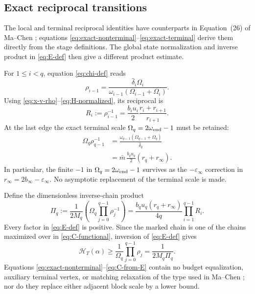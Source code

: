 \documentclass[11pt]{article}
\theoremstyle{definition}
\theoremstyle{remark}
\newcommand{\cert}{\mathcal{H}}
\newcommand{\invprod}{\Pi}
\newcommand{\rankmass}{M}
\begin{document}
\subsection{Exact reciprocal transitions}

The local and terminal reciprocal identities have counterparts in
Equation~(26) of Ma--Chen \cite{machen2026}; equations
\eqref{eq:exact-nonterminal}--\eqref{eq:exact-terminal} derive them directly
from the stage definitions.  The global state normalization and inverse
product in \eqref{eq:E-def} then give a different product estimate.

For \(1\le i<q\), equation \eqref{eq:chi-def} reads
\[
 \rho_{i-1}
 =\frac{\widehat\delta_i\Omega_i}
        {\omega_{i-1}(\Omega_{i-1}+\Omega_i)}.
\]
Using \eqref{eq:x-v-rho}--\eqref{eq:H-normalized}, its reciprocal is
\begin{equation}
 R_i:=\rho_{i-1}^{-1}
 =\frac{b_i u_i}{2}
  \frac{r_i+r_{i+1}}{r_{i+1}}.
 \label{eq:exact-nonterminal}
\end{equation}
At the last edge the exact terminal scale
\(\Omega_q=2\omega_{\rm end}-1\) must be retained:
\begin{equation}
\begin{aligned}
 \Omega_q\rho_{q-1}^{-1}
 &=\frac{\omega_{q-1}(\Omega_{q-1}+\Omega_q)}
         {\widehat\delta_q}\\
 &=\bar m\,\frac{b_qu_q}{2}(r_q+r_\infty).
\end{aligned}
\label{eq:exact-terminal}
\end{equation}
In particular, the finite \(-1\) in
\(\Omega_q=2\omega_{\rm end}-1\) survives as the
\(-\varepsilon_\infty\) correction in
\(r_\infty=2b_\infty-\varepsilon_\infty\).  No asymptotic replacement of
the terminal scale is made.

Define the dimensionless inverse-chain product
\begin{equation}
 \invprod_q
 :=\frac{1}{2\rankmass_q}
   \left(\Omega_q\prod_{j=0}^{q-1}\rho_j^{-1}\right)
 =\frac{b_qu_q(r_q+r_\infty)}{4q}
   \prod_{i=1}^{q-1}R_i.
 \label{eq:E-def}
\end{equation}
Every factor in \eqref{eq:E-def} is positive.  Since the marked chain is
one of the chains maximized over in \eqref{eq:C-functional}, inversion of
\eqref{eq:E-def} gives
\begin{equation}
 \cert_T(\alpha)
 \ge\frac1{\Omega_q}\prod_{j=0}^{q-1}\rho_j
 =\frac{1}{2\rankmass_q\invprod_q}.
 \label{eq:C-from-E}
\end{equation}
Equations \eqref{eq:exact-nonterminal}--\eqref{eq:C-from-E} contain no
budget equalization, auxiliary terminal vertex, or matching relaxation of
the type used in Ma--Chen \cite{machen2026}; nor do they replace either
adjacent block scale by a lower bound.
\end{document}
